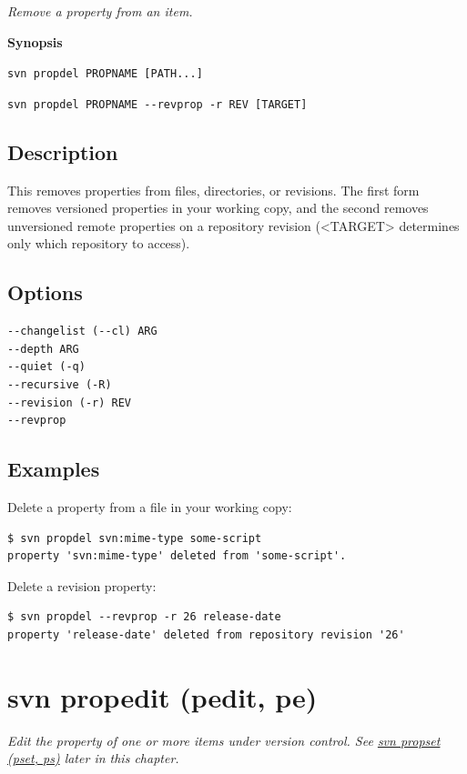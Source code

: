 \emph{Remove a property from an item.}

\textbf{Synopsis}

\texttt{svn\ propdel\ PROPNAME\ {[}PATH...{]}}

\texttt{svn\ propdel\ PROPNAME\ -\/-revprop\ -r\ REV\ {[}TARGET{]}}

\subsection{Description}

This removes properties from files, directories, or revisions. The first
form removes versioned properties in your working copy, and the second
removes unversioned remote properties on a repository revision
(\textless TARGET\textgreater{} determines only which repository to
access).

\subsection{Options}

\begin{verbatim}
--changelist (--cl) ARG
--depth ARG
--quiet (-q)
--recursive (-R)
--revision (-r) REV
--revprop
\end{verbatim}

\subsection{Examples}

Delete a property from a file in your working copy:

\begin{verbatim}
$ svn propdel svn:mime-type some-script
property 'svn:mime-type' deleted from 'some-script'.
\end{verbatim}

Delete a revision property:

\begin{verbatim}
$ svn propdel --revprop -r 26 release-date 
property 'release-date' deleted from repository revision '26'
\end{verbatim}

\section{svn propedit (pedit, pe)}\label{svn.ref.svn.c.propedit}

\emph{Edit the property of one or more items under version control. See
\hyperref[svn.ref.svn.c.propset]{svn propset (pset, ps)} later in this
chapter.}

